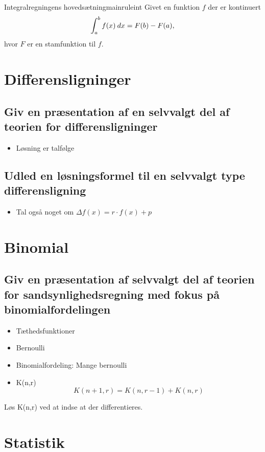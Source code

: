 \documentclass{article}
\begin{document}
\begin{theorem}{Integralregningens hovedsætning}{mainruleint}
	Givet en funktion $f$ der er kontinuert
	\[
		\int_a^b f(x) \:dx = F(b) - F(a),
	\]
	hvor $F$ er en stamfunktion til $f$.
\end{theorem}


\section{Differensligninger}
\subsection{Giv en præsentation af en selvvalgt del af teorien for differensligninger}
\begin{itemize}
	\item Løsning er talfølge
\end{itemize}
\subsection{Udled en løsningsformel til en selvvalgt type differensligning}
\begin{itemize}
	\item Tal også noget om $\Delta f(x) = r\cdot  f(x)+p$
\end{itemize}

\section{Binomial}
\subsection{Giv en præsentation af selvvalgt del af teorien for sandsynlighedsregning med fokus på 
binomialfordelingen}
\begin{itemize}
	\item Tæthedsfunktioner
	\item Bernoulli
	\item Binomialfordeling: Mange bernoulli
	\item K(n,r)
		\[
			K(n + 1, r) = K(n, r-1) + K(n, r)
		\]
\end{itemize}


Løs K(n,r) ved at indse at der differentieres.

\section{Statistik}
\end{document}
